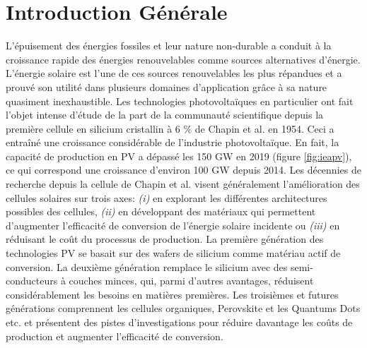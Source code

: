 \newpage
\tableofcontents
\newpage

\chapter*{Introduction Générale}
\label{sec:intro}
L’épuisement des énergies fossiles et leur nature non-durable a conduit à la croissance rapide des énergies renouvelables comme sources alternatives d'énergie. L’énergie solaire est l’une de ces sources renouvelables les plus répandues et a prouvé son utilité dans plusieurs domaines d'application grâce à sa nature quasiment inexhaustible. Les technologies photovoltaïques en particulier ont fait l'objet intense d'étude de la part de la communauté scientifique depuis la première cellule en silicium cristallin à 6 \% de Chapin et al. \cite{Chapin1954} en 1954. Ceci a entraîné une croissance considérable de l'industrie photovoltaïque. En fait, la capacité de production en PV a dépassé les 150 GW \cite{iea2020} en 2019 (figure \ref{fig:ieapv}), ce qui correspond une croissance d'environ 100 GW depuis 2014. Les décennies de recherche depuis la cellule de Chapin et al. visent généralement l'amélioration des cellules solaires sur trois axes: \textit{(i)} en explorant les différentes architectures possibles des cellules, \textit{(ii)} en développant des matériaux qui permettent d'augmenter l'efficacité de conversion de l'énergie solaire incidente ou \textit{(iii)} en réduisant le coût du processus de production. La première génération des technologies PV se basait sur des wafers de silicium comme matériau actif de conversion. La deuxième génération remplace le silicium avec des semi-conducteurs à couches minces, qui, parmi d'autres avantages, réduisent considérablement les besoins en matières premières. Les troisièmes et futures générations comprennent les cellules organiques, Perovskite et les Quantums Dots etc. et présentent des pistes d'investigations pour réduire davantage les coûts de production et augmenter l'efficacité de conversion.

